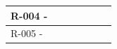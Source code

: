 \begin{landscape}
\begin{table}[]
{\begin{tabular}{lllllll}
R-004 -                                                                     &                                                                                                                                                                                                                                                                &                                                                                                                                                                                                                                                                &                         &                                                                                                                                                                  &                                                                                                                                                 &                                                                                                                                        \\ \hline
R-005 -                                                                     &                                                                                                                                                                                                                                                                &                                                                                                                                                                                                                                                                &                         &                                                                                                                                                                  &                                                                                                                                                 &                                                                                                                                        \\ \hline

\end{tabular}}
\end{table}
\end{landscape}
